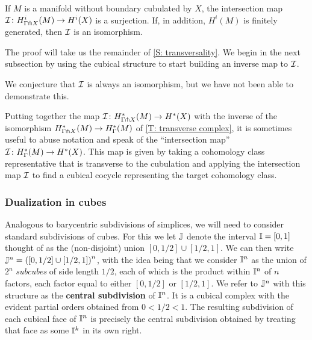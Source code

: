 \begin{theorem}\label{T: intersection qi}
	If $M$ is a manifold without boundary cubulated by $X$, the intersection map $\mathcal{I} \colon H^i_{\Gamma \pitchfork X}(M) \to H^i(X)$ is a surjection.
	If, in addition, $H^i(M)$ is finitely generated, then $\mathcal{I}$ is an isomorphism.
\end{theorem}

The proof will take us the remainder of \cref{S: transversality}.
We begin in the next subsection by using the cubical structure to start building an inverse map to $\mathcal{I}$.

We conjecture that $\mathcal{I}$ is always an isomorphism, but we have not been able to demonstrate this.


\begin{remark}\label{R: intersection map extension}
	Putting together the map $\mathcal{I} \colon H^*_{\Gamma \pitchfork X}(M) \to H^*(X)$ with the inverse of the isomorphism $H^*_{\Gamma \pitchfork X}(M) \to H^*_\Gamma(M)$ of \cref{T: transverse complex}, it is sometimes useful to abuse notation and speak of the ``intersection map'' $\mathcal{I} \colon H^*_\Gamma(M) \to H^*(X)$.
	This map is given by taking a cohomology class representative that is transverse to the cubulation and applying the intersection map $\mathcal{I}$ to find a cubical cocycle representing the target cohomology class.
\end{remark}

\subsubsection{Dualization in cubes}\label{S: dual cubes}

Analogous to barycentric subdivisions of simplices, we will need to consider standard subdivisions of cubes.
For this we let $\mathbb{J}$ denote the interval $\mathbb{I} = [0,1]$ thought of as the (non-disjoint) union $[0,1/2] \cup [1/2,1]$.
We can then write $\mathbb{J}^n = \left([0,1/2] \cup [1/2,1]\right)^n$, with the idea being that we consider $\mathbb{I}^n$ as the union of $2^n$ \textit{subcubes} of side length $1/2$, each of which is the product within $\mathbb{I}^n$ of $n$ factors, each factor equal to either $[0,1/2]$ or $[1/2,1]$.
We refer to $\mathbb{J}^n$ with this structure as the \textbf{central subdivision} of $\mathbb{I}^n$.
It is a cubical complex with the evident partial orders obtained from $0 < 1/2 < 1$.
The resulting subdivision of each cubical face of $\mathbb{I}^n$ is precisely the central subdivision obtained by treating that face as some $\mathbb{I}^k$ in its own right.

